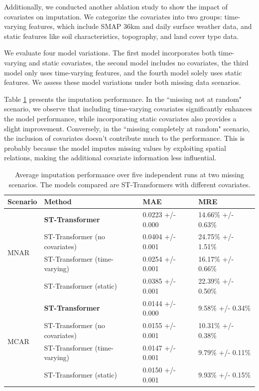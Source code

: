 \documentclass[11pt]{article}
\begin{document}
Additionally, we conducted another ablation study to show the impact of covariates on imputation. We categorize the covariates into two groups: time-varying features, which include SMAP 36km and daily surface weather data, and static features like soil characteristics, topography, and land cover type data.

We evaluate four model variations. The first model incorporates both time-varying and static covariates, the second model includes no covariates, the third model only uses time-varying features, and the fourth model solely uses static features. We assess these model variations under both missing data scenarios.

Table \ref{tab: ablation_study_2} presents the imputation performance. In the ``missing not at random" scenario, we observe that including time-varying covariates significantly enhances the model performance, while incorporating static covariates also provides a slight improvement. Conversely, in the ``missing completely at random" scenario, the inclusion of covariates doesn't contribute much to the performance. This is probably because the model imputes missing values by exploiting spatial relations, making the additional covariate information less influential.


\begin{table}[h!]
    \centering
    \begin{tabularx}{\textwidth}{XXXX}
        \toprule
        Scenario&Method & MAE & MRE \\
        \midrule
        \multirow{4}{*}{MNAR}&\textbf{ST-Transformer} &  0.0223 +/- 0.000 & 14.66\% +/- 0.63\%  \\

        &ST-Transformer (no covariates) & 0.0404 +/- 0.001& 24.75\% +/- 1.51\%\\
        &ST-Transformer (time-varying) & 0.0254	 +/- 0.001& 16.17\% +/- 0.66\% \\
        &ST-Transformer (static) & 0.0385 +/- 0.001 & 22.39\% +/- 0.50\% \\
        \midrule
          \multirow{4}{*}{MCAR}&\textbf{ST-Transformer} & 0.0144 +/- 0.000 & 9.58\% +/- 0.34\%  \\
        &ST-Transformer (no covariates) & 0.0155 +/- 0.001& 10.31\% +/- 0.38\%\\
        &ST-Transformer (time-varying) & 0.0147 +/- 0.001& 9.79\% +/- 0.11\% \\
        &ST-Transformer (static) & 0.0150 +/- 0.001 & 9.93\% +/- 0.15\% \\
        \bottomrule

        
    \end{tabularx}
    \caption{Average imputation performance over five independent runs at two missing scenarios. The models compared are ST-Transformers with different covariates.}
    \label{tab: ablation_study_2}
\end{table}
\end{document}
